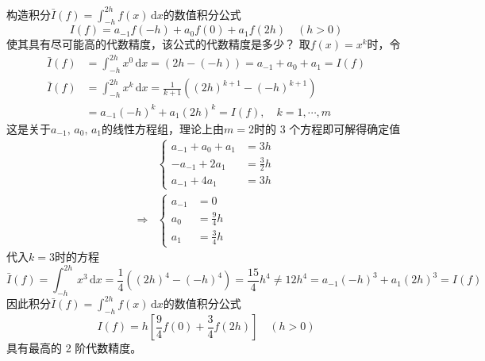 \documentclass[11pt]{article}
\begin{document}
\begin{question}
    \questiontext
    {
    构造积分$\bar{I}(f) = \displaystyle \int_{-h}^{2h}\!{f(x)\,\text{d}x}$的数值积分公式
    \begin{equation*}
        I(f) = a_{-1}f(-h) + a_0f(0) + a_1f(2h) \quad (h > 0)
    \end{equation*}
    使其具有尽可能高的代数精度，该公式的代数精度是多少？
    }
    \answer
    {
    取$f(x) = x^k$时，令
    \begin{align*}
        \bar{I}(f) & = \int_{-h}^{2h}\!{x^0\,\text{d}x} = \left(2h - (-h)\right) = a_{-1} + a_0 + a_1 = I(f)      \\
        \bar{I}(f) & = \int_{-h}^{2h}\!{x^k\,\text{d}x} = \frac{1}{k + 1}\left((2h)^{k + 1} - (-h)^{k + 1}\right) \\
                   & = a_{-1}(-h)^k + a_1(2h)^k = I(f),\quad k = 1,\cdots, m
    \end{align*}
    这是关于$a_{-1},\, a_0,\, a_1$的线性方程组，理论上由$m = 2$时的 3 个方程即可解得确定值
    \begin{align*}
                    & \left\{
        \begin{aligned}
            a_{-1} + a_0 + a_1 & = 3h           \\
            -a_{-1} + 2a_1     & = \frac{3}{2}h \\
            a_{-1} + 4a_1      & = 3h
        \end{aligned}
        \right.               \\
        \Rightarrow & \left\{
        \begin{aligned}
            a_{-1} & = 0            \\
            a_0    & = \frac{9}{4}h \\
            a_1    & =\frac{3}{4}h
        \end{aligned}
        \right.
    \end{align*}
    代入$k = 3$时的方程
    \begin{equation*}
        \bar{I}(f) = \int_{-h}^{2h}\!{x^3\,\text{d}x} = \frac{1}{4}\left((2h)^{4} - (-h)^{4}\right) = \frac{15}{4}h^4 \neq 12h^4 = a_{-1}(-h)^3 + a_1(2h)^3 = I(f)
    \end{equation*}
    因此积分$\bar{I}(f) = \displaystyle \int_{-h}^{2h}\!{f(x)\,\text{d}x}$的数值积分公式
    \begin{equation*}
        I(f) = h\left[\frac{9}{4}f(0) + \frac{3}{4}f(2h)\right] \quad (h > 0)
    \end{equation*}
    具有最高的 2 阶代数精度。
    }
\end{question}
\end{document}

